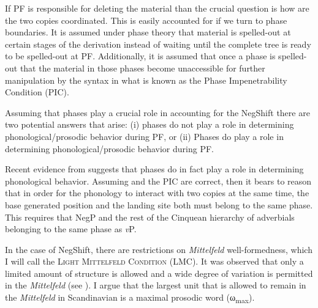 \documentclass[12pt, letterpaper]{article}
\newcommand{\sub}[1]{\textsubscript{#1}}
\begin{document}
If PF is responsible for deleting the material than the crucial question is how are the two copies coordinated. This is easily accounted for if we turn to phase boundaries. It is assumed under phase theory \citep{chomskyDerivationPhase2001,chomskyPhases2008} that material is spelled-out at certain stages of the derivation instead of waiting until the complete tree is ready to be spelled-out at PF. Additionally, it is assumed that once a phase is spelled-out that the material in those phases become unaccessible for further manipulation by the syntax in what is known as the Phase Impenetrability Condition (PIC). 

Assuming that phases play a crucial role in accounting for the NegShift there are two potential answers that arise: (i) phases do not play a role in determining phonological/prosodic behavior during PF, or (ii) Phases do play a role in determining phonological/prosodic behavior during PF.

Recent evidence from \citet{weberPhaseBasedConstraints2021} suggests that phases do in fact play a role in determining phonological behavior. Assuming \citeauthor{weberPhaseBasedConstraints2021} and the PIC are correct, then it bears to reason that in order for the phonology to interact with two copies at the same time, the base generated position and the landing site both must belong to the same phase. This requires that NegP and the rest of the Cinquean hierarchy of adverbials \citep{cinqueAdverbsFunctionalHeads1999} belonging to the same phase as \emph{v}P.

In the case of NegShift, there are restrictions on \emph{Mittelfeld} well-formedness, which I will call the \textsc{Light Mittelfeld Condition} (LMC). It was observed that only a limited amount of structure is allowed and a wide degree of variation is permitted in the \emph{Mittelfeld} (see \cite{haiderMittelfeldPhenomenaScrambling2017}). I argue that the largest unit that is allowed to remain in the \emph{Mittelfeld} in Scandinavian is a maximal prosodic word (ω\sub{max}).
\end{document}
